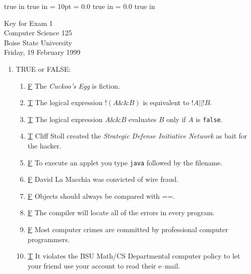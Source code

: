 \pagestyle{empty}
 true in
 true in
\topmargin = 10pt
\oddsidemargin = 0.0 true in
\evensidemargin = 0.0 true in
\newcommand{\ul}{\underline}
\newcommand{\spa}{\hspace{.25in}}


{\Large
\begin{center}
    Key for Exam 1 \\
    Computer Science 125 \\
    Boise State University\\
    Friday, 19 February 1999
\end{center}
}

\begin{enumerate}

   \item TRUE or FALSE:
        \begin{enumerate}
            \item \underline{F} The {\em Cuckoo's Egg} is fiction.
\smallskip
            \item \underline{T} The logical expression
                $!(A\&\&B)$ is equivalent to $!A||!B$.
\smallskip
            \item \underline{T} The logical expression
                $A\&\&B$ evaluates $B$ only if $A$ is {\tt false}.
\smallskip
            \item \underline{T} Cliff Stoll created the
            {\em Strategic Defense Initiative Network} as bait for the hacker.
\smallskip
            \item \underline{F} To execute an applet you type {\tt java} followed by the filename.
\smallskip
            \item \underline{F} David La Macchia was convicted of wire fraud.
\smallskip
            \item \underline{F} Objects should always be compared
            with ==.
\smallskip
            \item \underline{F} The compiler will locate all of the errors in every program.
\smallskip
            \item \underline{F} Most computer crimes are
            committed by professional computer programmers.
\smallskip
            \item \underline{T} It violates the BSU Math/CS
            Departmental computer policy to let your friend use your account
            to read their e--mail.
\end{enumerate}


\end{enumerate}
